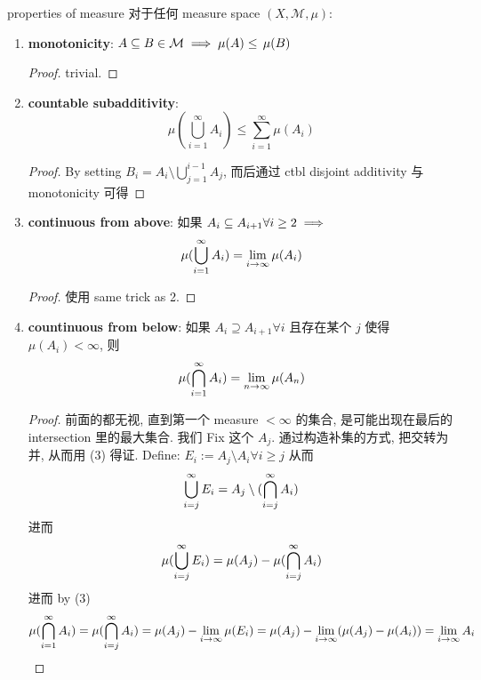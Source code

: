 \documentclass[lang=cn,11pt]{elegantbook}
\begin{document}
\begin{theorem}{properties of measure}
    对于任何 measure space $(X,\mathcal{M}, \mu)$:
    \begin{enumerate}
        \item \textbf{monotonicity}: $A \subseteq B \in \mathcal{M} \implies \mu(A) \leq \,\mu(B)$
        \begin{proof}
            trivial.
        \end{proof}
        \item \textbf{countable subadditivity}: 
        $$
        \mu(\bigcup_{i=1}^\infty A_i) \leq \sum_{i=1}^\infty \mu(A_i)
        $$
        \begin{proof}
            By setting $B_i = A_i \setminus \bigcup_{j=1}^{i-1} A_j$, 而后通过 ctbl disjoint additivity 与 monotonicity 可得
        \end{proof}
        \item \textbf{continuous from above}: 
        如果 $A_i \subseteq A_{i+1} \forall i \geq 2\implies $
        $$
        \mu(\bigcup_{i=1}^{\infty}A_i   ) = \lim_{i \rightarrow \infty} \mu(A_i)
        $$
        \begin{proof}
            使用 same trick as 2.
        \end{proof}
        \item \textbf{countinuous from below}:
        如果 $A_i \supseteq A_{i+1} \forall i$ 且存在某个 $j$ 使得 $\mu(A_i) < \infty$, 则
        $$
        \mu(\bigcap_{i=1}^{\infty}A_i) = \lim_{n \rightarrow \infty} \mu(A_n)
        $$
        \begin{proof}
            前面的都无视, 直到第一个 measure $< \infty$ 的集合, 是可能出现在最后的 intersection 里的最大集合. 我们 Fix 这个 $A_j$. 通过构造补集的方式, 把交转为并, 从而用 (3) 得证.
            Define:
            $
            E_i := A_j \setminus A_i \forall i \geq j
            $
            从而
            $$
            \bigcup_{i=j}^\infty E_i = A_j \setminus (\bigcap_{i=j}^\infty A_i)
            $$进而 
            $$
            \mu( \bigcup_{i=j}^\infty E_i) = \mu(A_j) - \mu(\bigcap_{i=j}^\infty A_i)
            $$
            进而 by (3)
            $$
            \mu(\bigcap_{i=1}^\infty A_i) = \mu(\bigcap_{i=j}^\infty A_i) = \mu(A_j) - \lim_{i\rightarrow \infty}\mu(E_i)  = \mu(A_j) - \lim_{i\rightarrow \infty}(\mu(A_j) - \mu(A_i))
            = \lim_{i\rightarrow \infty} A_i
            $$
            
        \end{proof}
    \end{enumerate}
\end{theorem}
\end{document}
